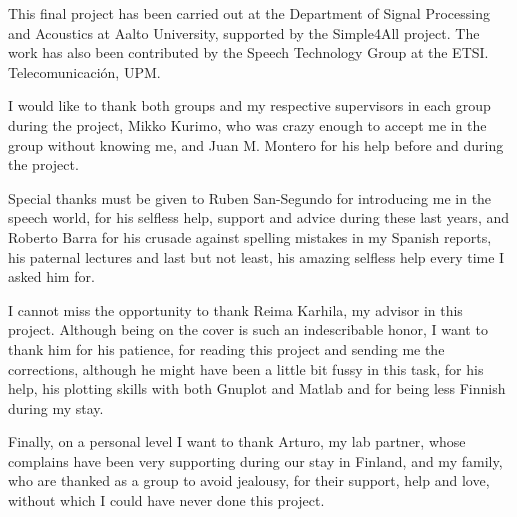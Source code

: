 \documentclass[english,12pt,a4paper,pdftex]{article}
\begin{document}

\makecoverpage

\newpage
%



This final project has been carried out at the Department of Signal Processing and Acoustics at Aalto University, supported by the Simple4All project. The work has also been contributed by the Speech Technology Group at the ETSI. Telecomunicaci\'on, UPM.

I would like to thank both groups and my respective supervisors in each group during the project, Mikko Kurimo, who was crazy enough to accept me in the group without knowing me, and Juan M. Montero for his help before and during the project. 

Special thanks must be given to Ruben San-Segundo for introducing me in the speech world, for his selfless help, support and advice during these last years, and Roberto Barra for his crusade against spelling mistakes in my Spanish reports, his paternal lectures and last but not least, his amazing selfless help every time I asked him for.

I cannot miss the opportunity to thank Reima Karhila, my advisor in this project. Although being on the cover is such an indescribable honor, I want to thank him for his patience, for reading this project and sending me the corrections, although he might have been a little bit fussy in this task, for his help, his plotting skills with both Gnuplot and Matlab and for being less Finnish during my stay.

Finally, on a personal level I want to thank Arturo, my lab partner, whose complains have been very supporting during our stay in Finland, and my family, who are thanked as a group to avoid jealousy, for their support, help and love, without which I could have never done this project.
\end{document}
